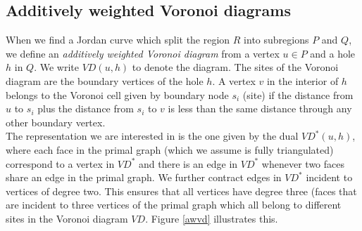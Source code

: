 \subsection{Additively weighted Voronoi diagrams}
When we find a Jordan curve which split the region $R$ into subregions $P$ and $Q$, we
define an \textit{additively weighted Voronoi diagram} from a vertex $u\in P$ and a hole
$h$ in $Q$. We write $VD(u,h)$ to denote the diagram. The sites of the Voronoi diagram
are the boundary vertices of the hole $h$. A vertex $v$ in the interior of $h$ belongs to
the Voronoi cell given by boundary node $s_i$ (site) if the distance from $u$ to $s_i$ plus the distance from $s_i$ to $v$ is less
than the same distance through any other boundary vertex. \\
The representation we are interested in is the one given by the dual $VD^*(u,h)$, where
each face in the primal graph (which we assume is fully triangulated) correspond to a
vertex in $VD^*$ and there is an edge in $VD^*$ whenever two faces share an edge in the
primal graph. We further contract edges in $VD^*$ incident to vertices of degree two.
This ensures that all vertices have degree three (faces that are incident to three
vertices of the primal graph which all belong to different sites in the Voronoi diagram
$VD$. Figure \ref{awvd} illustrates this. \\
